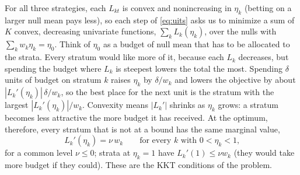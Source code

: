 \documentclass[11pt]{article}
\theoremstyle{plain}
\theoremstyle{definition}
\theoremstyle{remark}
\begin{document}
For all three strategies, each $L_{kt}$ is convex and nonincreasing in $\eta_k$ (betting on a larger null mean pays
less), so each step of \eqref{eq:uits} asks us to minimize a sum of $K$ convex, decreasing univariate functions,
$\sum_kL_k(\eta_k)$, over the nulls with $\sum_kw_k\eta_k=\eta_0$.  Think of $\eta_0$ as a budget of null mean that has to
be allocated to the strata.  Every stratum would like more of it, because each $L_k$ decreases, but spending the
budget where $L_k$ is steepest lowers the total the most.  Spending $\delta$ units of budget on stratum $k$ raises
$\eta_k$ by $\delta/w_k$ and lowers the objective by about $|L_k'(\eta_k)|\,\delta/w_k$, so the best place for the next unit is
the stratum with the largest $|L_k'(\eta_k)|/w_k$.  Convexity means $|L_k'|$ shrinks as $\eta_k$ grows: a stratum becomes
less attractive the more budget it has received.  At the optimum, therefore, every stratum that is not at a bound has
the same marginal value,
\begin{equation}\label{eq:kkt}
L_k'(\eta_k) = \nu\,w_k \qquad\text{for every $k$ with $0<\eta_k<1$,}
\end{equation}
for a common level $\nu\le0$; strata at $\eta_k=1$ have $L_k'(1)\le\nu w_k$ (they would take more budget if they
could).  These are the KKT conditions of the problem.
\end{document}
